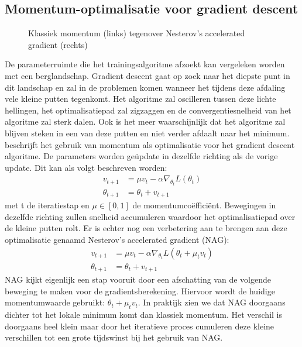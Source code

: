 \subsection{Momentum-optimalisatie voor gradient descent}
\begin{figure}[!t]
	\centering
	\def\svgwidth{0.6\columnwidth}
	
	\caption{Klassiek momentum (links) tegenover Nesterov's accelerated gradient (rechts) \cite{sutskever2013importance}}
	\label{fig:momentum}
\end{figure}
De parameterruimte die het trainingsalgoritme afzoekt kan vergeleken worden met een berglandschap. Gradient descent gaat op zoek naar het diepste punt in dit landschap en zal in de problemen komen wanneer het tijdens deze afdaling vele kleine putten tegenkomt. Het algoritme zal oscilleren tussen deze lichte hellingen, het optimalisatiepad zal zigzaggen en de convergentiesnelheid van het algoritme zal sterk dalen. Ook is het meer waarschijnlijk dat het algoritme zal blijven steken in een van deze putten en niet verder afdaalt naar het minimum.
\npar \cite{botev_nesterovs_2016} beschrijft het gebruik van momentum als optimalisatie voor het gradient descent algoritme. De parameters worden ge\"update in dezelfde richting als de vorige update. Dit kan als volgt beschreven worden:
\begin{equation}
\begin{aligned}
v_{t+1} &= \mu v_{t} - \alpha\nabla_{\theta_t} L(\theta_{t})\\
\theta_{t+1} &= \theta_t + v_{t+1}
\end{aligned}
\end{equation}
met t de iteratiestap en $\mu \in[0,1]$ de momentumco\"effici\"ent. Bewegingen in dezelfde richting zullen snelheid accumuleren waardoor het optimalisatiepad over de kleine putten rolt. Er is echter nog een verbetering aan te brengen aan deze optimalisatie genaamd Nesterov's accelerated gradient (NAG):
\begin{equation}
\begin{aligned}
v_{t+1} &= \mu v_t - \alpha\nabla_{\theta_t} L(\theta_{t}+\mu_tv_t)\\
\theta_{t+1} &= \theta_t + v_{t+1}
\end{aligned}
\end{equation}
\npar NAG kijkt eigenlijk een stap vooruit door een afschatting van de volgende beweging te maken voor de gradientsberekening. Hiervoor wordt de huidige momentumwaarde gebruikt: $\theta_{t}+\mu_tv_t$.  In praktijk zien we dat NAG doorgaans dichter tot het lokale minimum komt dan klassiek momentum. Het verschil is doorgaans heel klein maar door het iteratieve proces cumuleren deze kleine verschillen tot een grote tijdswinst bij het gebruik van NAG.


